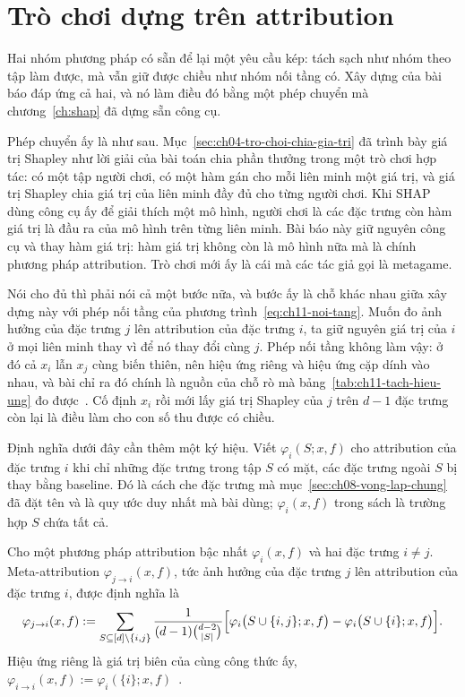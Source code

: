 \section{Trò chơi dựng trên attribution}
\label{sec:ch11-tro-choi-dung-tren-attribution}

%
Hai nhóm phương pháp có sẵn để lại một yêu cầu kép: tách sạch
 như nhóm theo tập làm được, mà vẫn
giữ được chiều như nhóm nối tầng có. Xây dựng của bài báo đáp ứng cả hai, và nó
làm điều đó bằng một phép chuyển mà chương~\ref{ch:shap} đã dựng sẵn công cụ.

Phép chuyển ấy là như sau. Mục~\ref{sec:ch04-tro-choi-chia-gia-tri} đã trình
bày giá trị Shapley như lời giải của bài toán chia phần thưởng trong một trò
chơi hợp tác: có một tập người chơi, có một hàm gán cho mỗi liên minh một giá
trị, và giá trị Shapley chia giá trị của liên minh đầy đủ cho từng người chơi.
Khi SHAP dùng công cụ ấy để giải thích một mô hình, người chơi là các đặc trưng
còn hàm giá trị là đầu ra của mô hình trên từng liên minh. Bài báo này giữ
nguyên công cụ và thay hàm giá trị: hàm giá trị không còn là mô hình nữa mà là
chính phương pháp attribution. Trò chơi mới ấy là cái mà các tác giả gọi là
metagame.

Nói cho đủ thì phải nói cả một bước nữa, và bước ấy là chỗ khác nhau giữa xây
dựng này với phép nối tầng của phương trình~\ref{eq:ch11-noi-tang}. Muốn đo ảnh
hưởng của đặc trưng $j$ lên attribution của đặc trưng $i$, ta giữ nguyên giá
trị của $i$ ở mọi liên minh thay vì để nó thay đổi cùng $j$. Phép nối tầng
không làm vậy: ở đó cả $x_i$ lẫn $x_j$ cùng biến thiên, nên hiệu ứng riêng và
hiệu ứng cặp dính vào nhau, và bài chỉ ra đó chính là nguồn của chỗ rò mà
bảng~\ref{tab:ch11-tach-hieu-ung} đo được~\autocite{p23metagame}. Cố định $x_i$
rồi mới lấy giá trị Shapley của $j$ trên $d-1$ đặc trưng còn lại là điều làm
cho con số thu được có chiều.

Định nghĩa dưới đây cần thêm một ký hiệu. Viết $\varphi_i(S; x, f)$ cho
attribution của đặc trưng $i$ khi chỉ những đặc trưng trong tập $S$ có mặt, các
đặc trưng ngoài $S$ bị thay bằng baseline. Đó là cách che đặc trưng mà
mục~\ref{sec:ch08-vong-lap-chung} đã đặt tên và là quy ước duy nhất mà bài
dùng; $\varphi_i(x,f)$ trong sách là trường hợp $S$ chứa tất cả.

\begin{definition}
  \label{def:ch11-meta-attribution}
  Cho một phương pháp attribution bậc nhất $\varphi_i(x,f)$ và hai đặc trưng
  $i \neq j$. Meta-attribution $\varphi_{j \to i}(x,f)$, tức ảnh hưởng của đặc
  trưng $j$ lên attribution của đặc trưng $i$, được định nghĩa là
  \begin{equation*}
    \varphi_{j \to i}(x,f) :=
    \sum_{S \subseteq [d] \setminus \{i,j\}}
      \frac{1}{(d-1)\binom{d-2}{|S|}}
      \Bigl[\varphi_i\bigl(S \cup \{i,j\}; x, f\bigr)
          - \varphi_i\bigl(S \cup \{i\}; x, f\bigr)\Bigr].
  \end{equation*}
  Hiệu ứng riêng là giá trị biên của cùng công thức ấy,
  $\varphi_{i \to i}(x,f) := \varphi_i(\{i\}; x, f)$~\autocite{p23metagame}.
\end{definition}


